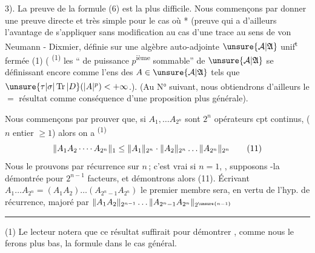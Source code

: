 3). La preuve de la formule (6) est la plus difficile.
Nous commençons par donner une
preuve directe et très simple pour le cas où
  *
(preuve qui a d'ailleurs l'avantage
de  s'appliquer sans modification au cas d'une
trace  au sens de von Neumann - Dixmier, définie
sur une algèbre auto-adjointe $\unsure{\mathcal A|\mathfrak A}$ 
 unif\textsuperscript{t} fermée 
(1) ( \textsuperscript{(1)} les ``  de puissance
$p$\textsuperscript{ième} sommable'' de $\unsure{\mathcal A|\mathfrak A}$ 
se définissant encore
comme l'ens des $A\in\unsure{\mathcal A|\mathfrak A}$ tels que
$\unsure{\tau|\sigma|\operatorname{Tr}|D}(|A|^p)<+\infty$.)\textsuperscript{}.
(Au N° suivant, nous
obtiendrons d'ailleurs le $=$ résultat comme
conséquence d'une proposition plus générale).

Nous commençons par prouver que, si
$A_1,\ldots A_{2^n}$ sont $2^n$ opérateurs cpt continus,
($n$ entier $\geq1$) alors on a \textsuperscript{(1)}
\[
\|A_1 A_2\mathinner{\cdotp\cdotp\cdotp\cdotp} A_{2^n}\|_1\leq\|A_1\|_{2^n}\cdot\|A_2\|_{2^n}\ldots\|A_{2^n}\|_{2^n}\tag*{(11)}
\]
Nous le prouvons par récurrence sur $n$\,;
c'est vrai si $n=1$,  , supposons
-la démontrée  pour $2^{n-1}$ facteurs, et démontrons
alors (11). Écrivant $A_1\ldots A_{2^n}=(A_1A_2)\ldots(A_{2^n-1}A_{2^n})$
le premier membre sera, en vertu de l'hyp.
de récurrence, majoré par $\|A_1A_2\|_{2^{n-1}}\ldots\|A_{2^n-1}A_{2^n}\|_{2^{\unsure{n-1}}}$

\noindent\rule{\linewidth}{0.3pt}

(1) Le lecteur notera que ce résultat suffirait pour
démontrer  , comme nous le ferons plus bas,
la formule  dans le cas général.


